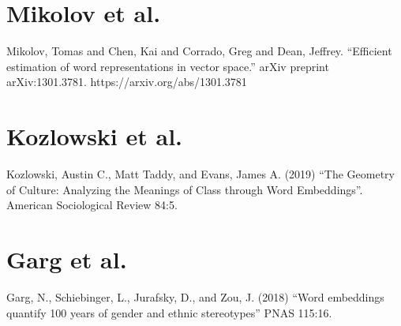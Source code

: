 \documentclass[a4paper]{book}
\begin{document}
  

\chapter{Mikolov et al.}

Mikolov, Tomas and Chen, Kai and Corrado, Greg and Dean, Jeffrey. ``Efficient estimation of word representations in vector space.'' arXiv preprint arXiv:1301.3781. https://arxiv.org/abs/1301.3781

  

\chapter{Kozlowski et al.}

Kozlowski, Austin C., Matt Taddy, and Evans, James A. (2019) ``The Geometry of Culture: Analyzing the Meanings of Class through Word Embeddings''. American Sociological Review 84:5.

  

\chapter{Garg et al.}

Garg, N., Schiebinger, L., Jurafsky, D., and Zou, J. (2018) ``Word embeddings quantify 100 years of gender and ethnic stereotypes'' PNAS 115:16.

  
\end{document}
